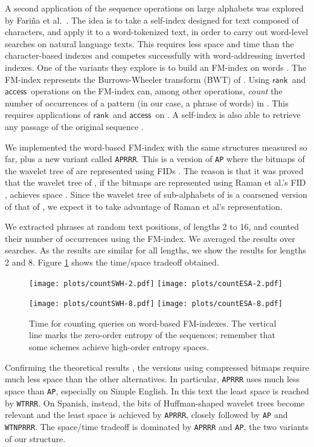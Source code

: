 \documentclass[11pt]{article}
\newcommand{\access}
    {\ensuremath{\mathsf{access}}}
\newcommand{\rank}
    {\ensuremath{\mathsf{rank}}}
\begin{document}
\begin{table}[t]
{\begin{tabular}
A second application of the sequence operations on large alphabets was
explored by Fari\~na et al.~\cite{FBNCPR11}. The idea is to take 
a self-index \cite{NM07} designed for text composed of characters, and apply 
it to a word-tokenized text, in order to carry out word-level searches on
natural language texts. This requires less space and time than the
character-based indexes and competes successfully with word-addressing
inverted indexes. One of the variants they explore is to build an FM-index 
\cite{FM05,FMMN07} on words \cite{CN08}. The FM-index represents the
Burrows-Wheeler transform (BWT) \cite{BW94}  of .
Using \rank\ and \access\ operations on  the FM-index can, 
among other operations, {\em count} the number of occurrences of a pattern 
 (in our case, a phrase of  words) in . This requires
 applications of \rank\ and \access\ on . A self-index 
is also able to retrieve any passage of the original sequence .

We implemented the word-based FM-index with the same structures measured so 
far, plus a new variant called \verb|APRRR|. This is a version of \verb|AP| 
where the bitmaps of the wavelet tree of  are represented using FIDs
\cite{RRR02}. The reason is that it was proved \cite{MN07impl} that the
wavelet tree of , if the bitmaps are represented using
Raman et al.'s FID \cite{RRR02}, achieves space .
Since the wavelet tree  of sub-alphabets of  is a 
coarsened version of that of , we expect it to take advantage
of Raman et al's representation.

We extracted phrases at random text positions, of lengths 2 to 16, and 
counted their number of occurrences using the FM-index. We averaged the
results over  searches. As the results
are similar for all lengths, we show the results for lengths 2 and 8.
Figure \ref{fig:count} shows the time/space tradeoff obtained. 

\begin{figure}[tb]
\centerline{\texttt{[image: plots/countSWH-2.pdf]}
\texttt{[image: plots/countESA-2.pdf]}}

\centerline{\texttt{[image: plots/countSWH-8.pdf]}
\texttt{[image: plots/countESA-8.pdf]}}
\caption{Time for counting queries on word-based FM-indexes. The vertical line marks the zero-order entropy of the sequences; remember that some schemes achieve high-order entropy spaces.}
\label{fig:count}
\end{figure}

Confirming the theoretical results \cite{MN07impl}, the versions using
compressed bitmaps require much less space than the other alternatives.
In particular, \texttt{APRRR} uses much less space than \texttt{AP}, 
especially on Simple English. In this text the least space is reached by
\texttt{WTRRR}. On Spanish, instead, the  bits of 
Huffman-shaped wavelet trees become
relevant and the least space is achieved by \texttt{APRRR}, closely followed
by \texttt{AP} and \texttt{WTNPRRR}. The space/time tradeoff is dominated
by \texttt{APRRR} and \texttt{AP}, the two variants of our structure.


\end{tabular}}
\end{table}
\end{document}

